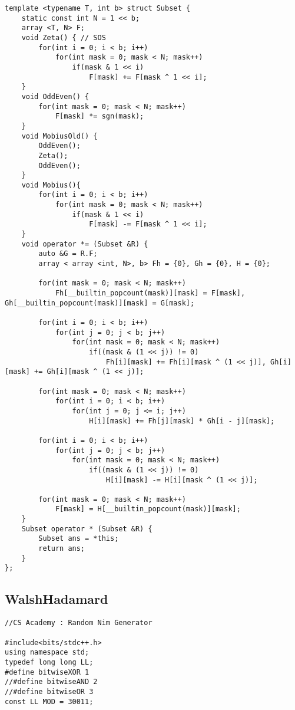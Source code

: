 \documentclass[FSZ,a4paper,onesided]{article}
\begin{document}
\begin{multicols*}{\COLS}
\begin{lstlisting}
template <typename T, int b> struct Subset {
    static const int N = 1 << b;
    array <T, N> F;
    void Zeta() { // SOS
        for(int i = 0; i < b; i++)
            for(int mask = 0; mask < N; mask++)
                if(mask & 1 << i)
                    F[mask] += F[mask ^ 1 << i];
    }
    void OddEven() {
        for(int mask = 0; mask < N; mask++)
            F[mask] *= sgn(mask);
    }
    void MobiusOld() {
        OddEven();
        Zeta();
        OddEven();
    }
    void Mobius(){
        for(int i = 0; i < b; i++)
            for(int mask = 0; mask < N; mask++)
                if(mask & 1 << i)
                    F[mask] -= F[mask ^ 1 << i];
    }
    void operator *= (Subset &R) {
        auto &G = R.F;
        array < array <int, N>, b> Fh = {0}, Gh = {0}, H = {0};

        for(int mask = 0; mask < N; mask++) 
            Fh[__builtin_popcount(mask)][mask] = F[mask], Gh[__builtin_popcount(mask)][mask] = G[mask];

        for(int i = 0; i < b; i++)
            for(int j = 0; j < b; j++)
                for(int mask = 0; mask < N; mask++)
                    if((mask & (1 << j)) != 0)
                        Fh[i][mask] += Fh[i][mask ^ (1 << j)], Gh[i][mask] += Gh[i][mask ^ (1 << j)];
                    
        for(int mask = 0; mask < N; mask++)
            for(int i = 0; i < b; i++)
                for(int j = 0; j <= i; j++)
                    H[i][mask] += Fh[j][mask] * Gh[i - j][mask];

        for(int i = 0; i < b; i++) 
            for(int j = 0; j < b; j++) 
                for(int mask = 0; mask < N; mask++) 
                    if((mask & (1 << j)) != 0) 
                        H[i][mask] -= H[i][mask ^ (1 << j)];
                
        for(int mask = 0; mask < N; mask++)  
            F[mask] = H[__builtin_popcount(mask)][mask];
    }
    Subset operator * (Subset &R) {
        Subset ans = *this;
        return ans;
    }
};
\end{lstlisting}
\subsection{WalshHadamard}
\begin{lstlisting}
//CS Academy : Random Nim Generator

#include<bits/stdc++.h>
using namespace std;
typedef long long LL;
#define bitwiseXOR 1
//#define bitwiseAND 2
//#define bitwiseOR 3
const LL MOD = 30011;


\end{lstlisting}
\end{multicols*}
\end{document}
